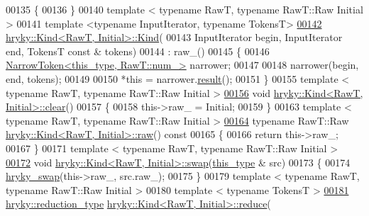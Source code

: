 \begin{DoxyCode}
00135 \{
00136 \}
00140 \textcolor{keyword}{template} < \textcolor{keyword}{typename} RawT, \textcolor{keyword}{typename} RawT::Raw Initial >
00141 \textcolor{keyword}{template} <\textcolor{keyword}{typename} InputIterator, \textcolor{keyword}{typename} TokensT>
\hypertarget{kind_8h_source_l00142}{}\hyperlink{classhryky_1_1_kind_a79a87dd56f32e4a504debb01de36e659}{00142} \hyperlink{classhryky_1_1_kind}{hryky::Kind<RawT, Initial>::Kind}(
00143     InputIterator begin, InputIterator end, TokensT \textcolor{keyword}{const} & tokens)
00144     : raw\_()
00145 \{
00146     \hyperlink{classhryky_1_1_narrow_token}{NarrowToken<this_type, RawT::num_>} narrower;
00147 
00148     narrower(begin, end, tokens);
00149 
00150     *\textcolor{keyword}{this} = narrower.\hyperlink{classhryky_1_1_narrow_token_af36664ab981d8d2616f8c0c99d145506}{result}();
00151 \}
00155 \textcolor{keyword}{template} < \textcolor{keyword}{typename} RawT, \textcolor{keyword}{typename} RawT::Raw Initial >
\hypertarget{kind_8h_source_l00156}{}\hyperlink{classhryky_1_1_kind_aa84071f7355cabc0be31763a106e18e7}{00156} \textcolor{keywordtype}{void} \hyperlink{namespacehryky_aa201297ea9530da954a7230be71cc19d}{hryky::Kind<RawT, Initial>::clear}()
00157 \{
00158     this->raw\_ = Initial;
00159 \}
00163 \textcolor{keyword}{template} < \textcolor{keyword}{typename} RawT, \textcolor{keyword}{typename} RawT::Raw Initial >
\hypertarget{kind_8h_source_l00164}{}\hyperlink{classhryky_1_1_kind_a092c3dbb200b1fc4e83bebff274ba23e}{00164} \textcolor{keyword}{typename} RawT::Raw \hyperlink{classhryky_1_1_kind}{hryky::Kind<RawT, Initial>::raw}()\textcolor{keyword}{ const}
00165 \textcolor{keyword}{}\{
00166     \textcolor{keywordflow}{return} this->raw\_;
00167 \}
00171 \textcolor{keyword}{template} < \textcolor{keyword}{typename} RawT, \textcolor{keyword}{typename} RawT::Raw Initial >
\hypertarget{kind_8h_source_l00172}{}\hyperlink{classhryky_1_1_kind_a3d9362db97d8529581597a8068d43cfb}{00172} \textcolor{keywordtype}{void} \hyperlink{namespacehryky_a4282146df5ea2b68cb667896a2205909}{hryky::Kind<RawT, Initial>::swap}(\hyperlink{classhryky_1_1_kind}{this_type} & src)
00173 \{
00174     \hyperlink{namespacehryky_add9c1c1fdfda07cd47bcb7c16d3a823a}{hryky_swap}(this->raw\_, src.raw\_);
00175 \}
00179 \textcolor{keyword}{template} < \textcolor{keyword}{typename} RawT, \textcolor{keyword}{typename} RawT::Raw Initial >
00180 \textcolor{keyword}{template} < \textcolor{keyword}{typename} TokensT >
\hypertarget{kind_8h_source_l00181}{}\hyperlink{classhryky_1_1_kind_ac4183ddb871fea3cdb2251ce6170c584}{00181} \hyperlink{classhryky_1_1_intrusive_ptr}{hryky::reduction_type} \hyperlink{namespacehryky_af41cb3af6766761da0ff21b84527a52c}{hryky::Kind<RawT, Initial>::reduce}(

\end{DoxyCode}
